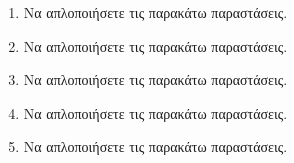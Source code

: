 \documentclass[twoside,nofonts,internet]{askhseis}
\begin{document}
\begin{enumerate}
\begin{multicols}{2}
\end{multicols}
\item Να απλοποιήσετε τις παρακάτω παραστάσεις.
\begin{multicols}{2}
\end{multicols}
\item Να απλοποιήσετε τις παρακάτω παραστάσεις.
\begin{multicols}{2}
\end{multicols}
\item Να απλοποιήσετε τις παρακάτω παραστάσεις.
\begin{multicols}{2}
\end{multicols}
\item Να απλοποιήσετε τις παρακάτω παραστάσεις.
\item Να απλοποιήσετε τις παρακάτω παραστάσεις.
\end{enumerate}
\end{document}

